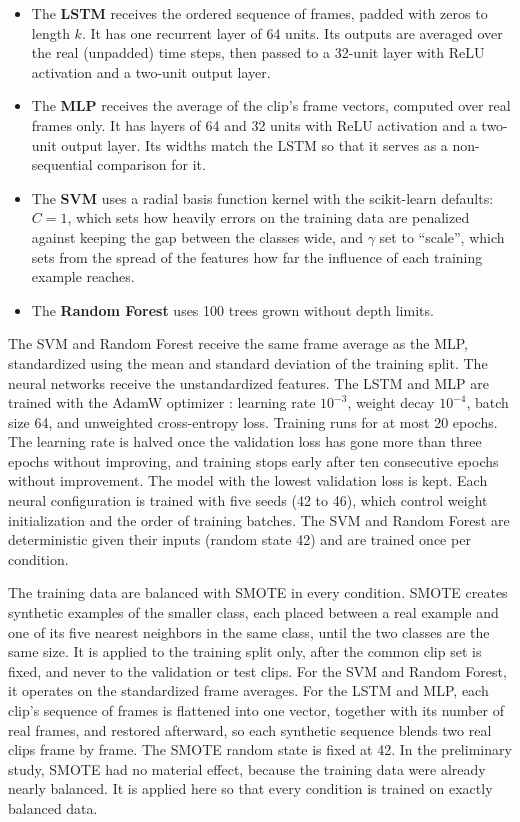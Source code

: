 \begin{itemize}
   \item The \textbf{LSTM} \cite{hochreiter1997} receives the ordered sequence of frames, padded with zeros to length $k$. It has one recurrent layer of 64 units. Its outputs are averaged over the real (unpadded) time steps, then passed to a 32-unit layer with ReLU activation and a two-unit output layer.
   \item The \textbf{MLP} receives the average of the clip's frame vectors, computed over real frames only. It has layers of 64 and 32 units with ReLU activation and a two-unit output layer. Its widths match the LSTM so that it serves as a non-sequential comparison for it.
   \item The \textbf{SVM} \cite{cortes1995} uses a radial basis function kernel with the scikit-learn defaults: $C = 1$, which sets how heavily errors on the training data are penalized against keeping the gap between the classes wide, and $\gamma$ set to ``scale'', which sets from the spread of the features how far the influence of each training example reaches.
   \item The \textbf{Random Forest} \cite{breiman2001} uses 100 trees grown without depth limits.
\end{itemize}

The SVM and Random Forest receive the same frame average as the MLP, standardized using the mean and standard deviation of the training split. The neural networks receive the unstandardized features. The LSTM and MLP are trained with the AdamW optimizer \cite{loshchilov2019}: learning rate $10^{-3}$, weight decay $10^{-4}$, batch size 64, and unweighted cross-entropy loss. Training runs for at most 20 epochs. The learning rate is halved once the validation loss has gone more than three epochs without improving, and training stops early after ten consecutive epochs without improvement. The model with the lowest validation loss is kept. Each neural configuration is trained with five seeds (42 to 46), which control weight initialization and the order of training batches. The SVM and Random Forest are deterministic given their inputs (random state 42) and are trained once per condition.

The training data are balanced with SMOTE \cite{chawla2002} in every condition. SMOTE creates synthetic examples of the smaller class, each placed between a real example and one of its five nearest neighbors in the same class, until the two classes are the same size. It is applied to the training split only, after the common clip set is fixed, and never to the validation or test clips. For the SVM and Random Forest, it operates on the standardized frame averages. For the LSTM and MLP, each clip's sequence of frames is flattened into one vector, together with its number of real frames, and restored afterward, so each synthetic sequence blends two real clips frame by frame. The SMOTE random state is fixed at 42. In the preliminary study, SMOTE had no material effect, because the training data were already nearly balanced. It is applied here so that every condition is trained on exactly balanced data.

